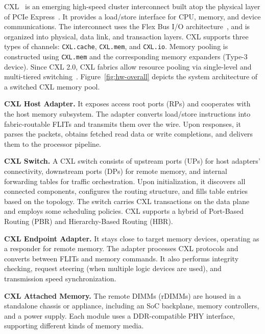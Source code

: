 CXL~\cite{cxl} is an emerging high-speed cluster interconnect built atop the physical layer of PCIe Express~\cite{pcie}. It provides a load/store interface for CPU, memory, and device communications. The interconnect uses the Flex Bus I/O architecture~\cite{cxl-spec}, and is organized into physical, data link, and transaction layers. CXL supports three types of channels: \texttt{CXL.cache}, \texttt{CXL.mem}, and  \texttt{CXL.io}.
Memory pooling is constructed using \texttt{CXL.mem} and the corresponding memory expanders (Type-3 device). Since CXL 2.0, CXL fabrics allow resource pooling via single-level and multi-tiered switching~\cite{cxl-spec}. Figure~\ref{fig:hw-overall} depicts the system architecture of a switched CXL memory pool.

\squishlist
    \item {\bf CXL Host Adapter.} It exposes access root ports (RPs) and cooperates with the host memory subsystem. The adapter converts load/store instructions into fabric-routable FLITs and transmits them over the wire. Upon responses, it parses the packets, obtains fetched read data or write completions, and delivers them to the processor pipeline.

    \item {\bf CXL Switch.} A CXL switch consists of upstream ports (UPs) for host adapters' connectivity, downstream ports (DPs) for remote memory, and internal forwarding tables for traffic orchestration. Upon initialization, it discovers all connected components, configures the routing structure, and fills table entries based on the topology. The switch carries CXL transactions on the data plane and employs some scheduling policies. CXL supports a hybrid of Port-Based Routing (PBR) and Hierarchy-Based Routing (HBR).

    \item {\bf CXL Endpoint Adapter.} It stays close to target memory devices, operating as a responder for remote memory. The adapter processes CXL protocols and converts between FLITs and memory commands. It also performs integrity checking, request steering (when multiple logic devices are used), and transmission speed synchronization.
    
    \item {\bf CXL Attached Memory.} The remote DIMMs (rDIMMs) are housed in a standalone chassis or appliance, including an SoC backplane, memory controllers, and a power supply. Each module uses a DDR-compatible PHY interface, supporting different kinds of memory media.
\squishend

